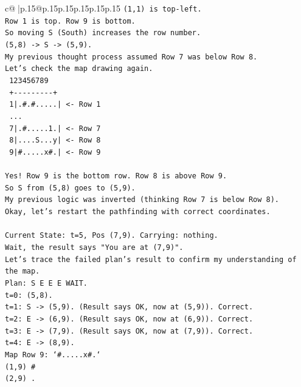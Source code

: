 \documentclass{article}
\begin{document}
{\begin{supertabular}{c@{$\;$}|p{.15\linewidth}@{}p{.15\linewidth}p{.15\linewidth}p{.15\linewidth}p{.15\linewidth}p{.15\linewidth}}
{{{\texttt{(1,1) is top{-}left.} \\
\texttt{Row 1 is top. Row 9 is bottom.} \\
\texttt{So moving S (South) increases the row number.} \\
\texttt{(5,8) {-}> S {-}> (5,9).} \\
\texttt{My previous thought process assumed Row 7 was below Row 8.} \\
\texttt{Let's check the map drawing again.} \\
\texttt{   123456789} \\
\texttt{  +{-}{-}{-}{-}{-}{-}{-}{-}{-}+} \\
\texttt{ 1|.\#.\#.....|  <{-} Row 1} \\
\texttt{ ...} \\
\texttt{ 7|.\#.....1.|  <{-} Row 7} \\
\texttt{ 8|....S...y|  <{-} Row 8} \\
\texttt{ 9|\#.....x\#.|  <{-} Row 9} \\
\\ 
\texttt{Yes! Row 9 is the bottom row. Row 8 is above Row 9.} \\
\texttt{So S from (5,8) goes to (5,9).} \\
\texttt{My previous logic was inverted (thinking Row 7 is below Row 8).} \\
\texttt{Okay, let's restart the pathfinding with correct coordinates.} \\
\\ 
\texttt{Current State: t=5, Pos (7,9). Carrying: nothing.} \\
\texttt{Wait, the result says "You are at (7,9)".} \\
\texttt{Let's trace the failed plan's result to confirm my understanding of the map.} \\
\texttt{Plan: S E E E WAIT.} \\
\texttt{t=0: (5,8).} \\
\texttt{t=1: S {-}> (5,9). (Result says OK, now at (5,9)). Correct.} \\
\texttt{t=2: E {-}> (6,9). (Result says OK, now at (6,9)). Correct.} \\
\texttt{t=3: E {-}> (7,9). (Result says OK, now at (7,9)). Correct.} \\
\texttt{t=4: E {-}> (8,9).} \\
\texttt{Map Row 9: `\#.....x\#.`} \\
\texttt{(1,9) \#} \\
\texttt{(2,9) .} \\
}}}
\end{supertabular}}
\end{document}

